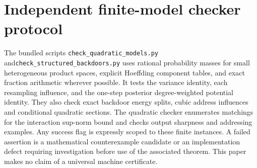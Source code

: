 \documentclass[11pt,letterpaper]{article}
\theoremstyle{definition}
\begin{document}
\section{Independent finite-model checker protocol}\label{sec:checker}
The bundled scripts \texttt{check\_quadratic\_models.py} and\newline \texttt{check\_structured\_backdoors.py} uses rational
probability masses for small heterogeneous product spaces, explicit
Hoeffding component tables, and exact fraction arithmetic wherever
possible. It tests the variance identity, each resampling influence,
and the one-step posterior degree-weighted potential identity.
They also check exact backdoor energy splits, cubic address
influences and conditional quadratic sections. The quadratic checker
enumerates matchings for the interaction sup-norm bound and checks
output sharpness and addressing examples.
Any success flag is expressly scoped to these finite instances.
A failed assertion is a mathematical counterexample candidate or
an implementation defect requiring investigation before use of
the associated theorem. This paper makes no claim of a universal
machine certificate.
\end{document}
